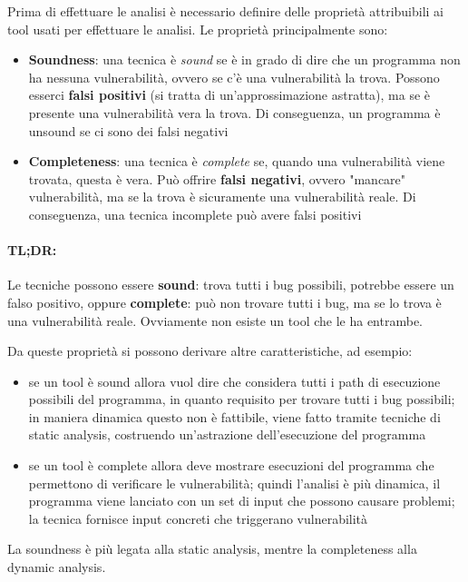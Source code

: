 Prima di effettuare le analisi è necessario definire delle proprietà attribuibili ai tool usati per effettuare le analisi. Le proprietà principalmente sono:
\begin{itemize}
	\item \textbf{Soundness}: una tecnica è \textit{sound} se è in grado di dire che un programma non ha nessuna vulnerabilità, ovvero se c'è una vulnerabilità la trova. Possono esserci \textbf{falsi positivi} (si tratta di un'approssimazione astratta), ma se è presente una vulnerabilità vera la trova. Di conseguenza, un programma è unsound se ci sono dei falsi negativi
    
	\item \textbf{Completeness}: una tecnica è \textit{complete} se, quando una vulnerabilità viene trovata, questa è vera. Può offrire \textbf{falsi negativi}, ovvero "mancare" vulnerabilità, ma se la trova è sicuramente una vulnerabilità reale. Di conseguenza, una tecnica incomplete può avere falsi positivi
\end{itemize}

\paragraph{TL;DR:} Le tecniche possono essere \textbf{sound}: trova tutti i bug possibili, potrebbe essere un falso positivo, oppure \textbf{complete}: può non trovare tutti i bug, ma se lo trova è una vulnerabilità reale. Ovviamente non esiste un tool che le ha entrambe.

Da queste proprietà si possono derivare altre caratteristiche, ad esempio:
\begin{itemize}
	\item se un tool è sound allora vuol dire che considera tutti i path di esecuzione possibili del programma, in quanto requisito per trovare tutti i bug possibili; in maniera dinamica questo non è fattibile, viene fatto tramite tecniche di static analysis, costruendo un'astrazione dell'esecuzione del programma
    
	\item se un tool è complete allora deve mostrare esecuzioni del programma che permettono di verificare le vulnerabilità; quindi l'analisi è più dinamica, il programma viene lanciato con un set di input che possono causare problemi; la tecnica fornisce input concreti che triggerano vulnerabilità
\end{itemize}

La soundness è più legata alla static analysis, mentre la completeness alla dynamic analysis.

